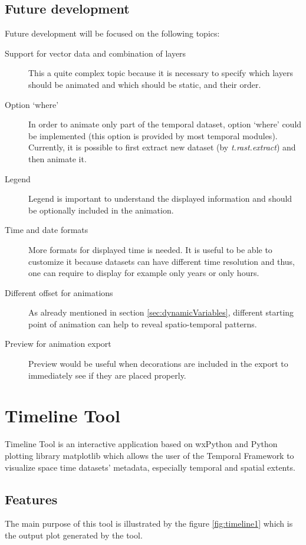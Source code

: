 \documentclass[a4paper,12pt,oneside]{book}
\newcommand{\module}[1]{\textsl{#1}}
\newcommand{\tf}{Temporal Framework\xspace}
\begin{document}
\subsection{Future development}
Future development will be focused on the following topics:
\begin{description}
  \item [Support for vector data and combination of layers]
  This a quite complex topic because it is necessary to specify which layers should be animated and
  which should be static, and their order.
  \item [Option `where'] In order to animate only part of the temporal dataset,
  option `where' could be implemented (this option is provided by most temporal modules).
  Currently, it is possible to first extract new dataset (by \module{t.rast.extract})
  and then animate it.
  
  \item [Legend] Legend is important to understand the displayed information and
  should be optionally included in the animation.
  \item [Time and date formats] More formats for displayed time is needed.
  It is useful to be able to customize it because datasets can have different
  time resolution and thus, one can require to display for example only years or only hours.

  \item [Different offset for animations] As already mentioned in section \ref{sec:dynamicVariables},
  different starting point of animation can help to reveal spatio-temporal patterns.

  \item [Preview for animation export] Preview would be useful when decorations are included in the export
  to immediately see if they are placed properly.
  
\end{description}



\section{Timeline Tool}
Timeline Tool is an interactive application based on wxPython and Python plotting library matplotlib \cite{matplotlib} which allows
the user of the \tf to visualize space time datasets' metadata, especially temporal and spatial extents.

\subsection{Features}
The main purpose of this tool is illustrated by the figure \ref{fig:timeline1}
which is the output plot generated by the tool.
\end{document}
